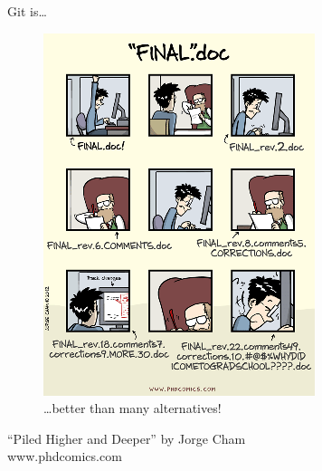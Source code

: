\begin{frame}{Git is\ldots}
  \begin{figure}
    \includegraphics[scale=0.5]{phd101212s.png}
    \\ \ldots better than many alternatives!
  \end{figure}
  \footnotesize{``Piled Higher and Deeper'' by Jorge Cham\\
    www.phdcomics.com}

\end{frame}


